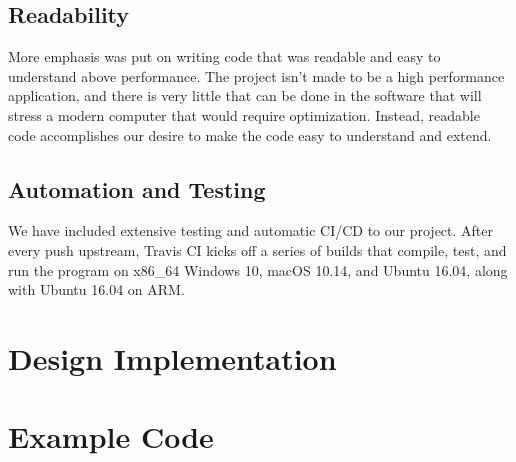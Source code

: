 \documentclass[conference]{IEEEtran}
\begin{document}
\subsection{Readability}
More emphasis was put on writing code that was readable and easy to understand above performance. The project isn't made to be a high performance application, and there is very little that can be done in the software that will stress a modern computer that would require optimization. Instead, readable code accomplishes our desire to make the code easy to understand and extend.


\subsection{Automation and Testing}

We have included extensive testing and automatic CI/CD to our project. After every push upstream, Travis CI kicks off a series of builds that compile, test, and run the program on x86\_64 Windows 10, macOS 10.14, and Ubuntu 16.04, along with Ubuntu 16.04 on ARM.


\section{Design Implementation}

\section{Example Code}
\end{document}
